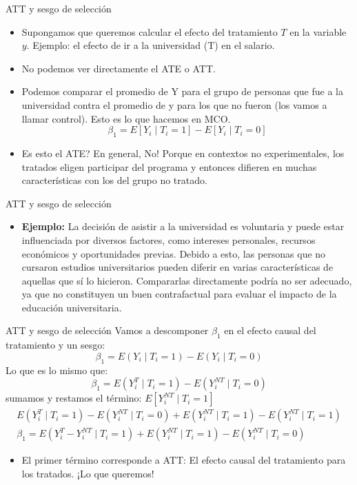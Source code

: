 \documentclass[10pt]{beamer}
\begin{document}
\begin{frame}{ATT y sesgo de selección}
    \begin{itemize}
        \item Supongamos que queremos calcular el efecto del tratamiento $T$ en la variable $y$. Ejemplo: el efecto de ir a la universidad (T) en el salario.
        \item No podemos ver directamente el ATE o ATT.
       
        \item Podemos comparar el promedio de Y para el grupo de personas que fue a la universidad contra el promedio de y para los que no fueron (los vamos a llamar control). Esto es lo que hacemos en MCO.
        $$
        \beta_1=E\left[Y_{i} \mid T_{i}=1\right]-E\left[Y_{i} \mid T_{i}=0\right]
        $$
        \item  Es esto el ATE? En general, No! Porque en contextos no experimentales, los tratados eligen participar del programa y entonces difieren en muchas caracter\'isticas con los del grupo no tratado.
    \end{itemize}
\end{frame}

\begin{frame}{ATT y sesgo de selección}
\begin{itemize}
        \item \textbf{Ejemplo:} La decisión de asistir a la universidad es voluntaria y puede estar influenciada por diversos factores, como intereses personales, recursos económicos y oportunidades previas. Debido a esto, las personas que no cursaron estudios universitarios pueden diferir en varias características de aquellas que sí lo hicieron. Compararlas directamente podría no ser adecuado, ya que no constituyen un buen contrafactual para evaluar el impacto de la educación universitaria.
       
    \end{itemize}
\end{frame}

\begin{frame}{ATT y sesgo de selección}
Vamos a descomponer $\beta_1$  en el efecto causal del tratamiento y un sesgo:
$$
\beta_1=E\left(Y_{i} \mid T_{i}=1\right)-E\left(Y_{i} \mid T_{i}=0\right)
$$
Lo que es lo mismo que:
$$
\beta_1=E\left(Y_{i}^{T} \mid T_{i}=1\right)-E\left(Y_{i}^{N T} \mid T_{i}=0\right)
$$
sumamos y restamos el t\'ermino: $E\left[Y_{i}^{N T} \mid T_{i}=1\right]$
$$
\begin{gathered}
E\left(Y_{i}^{T} \mid T_{i}=1\right)-E\left(Y_{i}^{N T} \mid T_{i}=0\right)+E\left(Y_{i}^{N T} \mid T_{i}=1\right)-E\left(Y_{i}^{N T} \mid T_{i}=1\right) \\
\beta_1=E\left(Y_{i}^{T}-Y_{i}^{N T} \mid T_{i}=1\right)+E\left(Y_{i}^{N T} \mid T_{i}=1\right)-E\left(Y_{i}^{N T} \mid T_{i}=0\right)
\end{gathered}
$$
\begin{itemize}
    \item El primer término corresponde a ATT: El efecto causal del tratamiento para los tratados. ¡Lo que queremos!
\end{itemize}
\end{frame}
\end{document}
